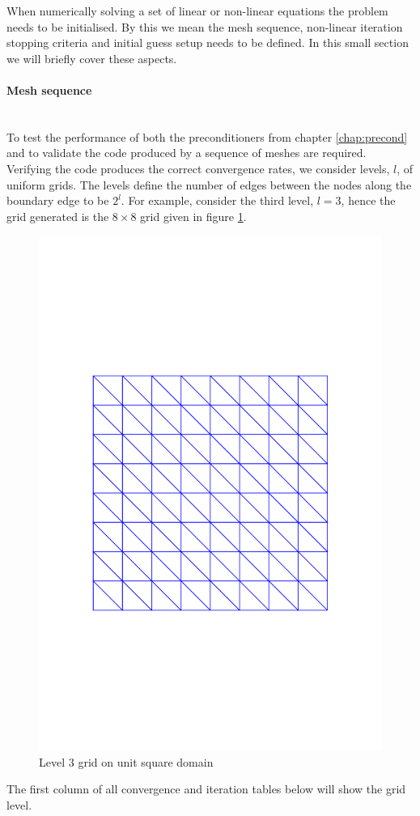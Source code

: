 When numerically solving a set of linear or non-linear equations the problem needs to be initialised. By this we mean the mesh sequence, non-linear iteration stopping criteria and initial guess setup needs to be defined. In this small section we will briefly cover these aspects.

\paragraph{Mesh sequence} ~\\

To test the performance of both the preconditioners from  chapter \ref{chap:precond} and to validate the code produced by \fenics a sequence of meshes are required. Verifying the code  produces the correct convergence rates, we consider levels, $l$, of uniform grids. The levels define the number of edges between the nodes along the boundary edge to be  $2^l$. For example, consider the third level, $l = 3$, hence the grid generated is the $8\times 8$ grid given in figure \ref{fig:2Dmesh}.
\begin{figure}[h!]
  \centering
    \includegraphics[scale=.5]{../Results/Figures/dolfin_plot_1}
    \caption{Level $3$ grid on unit square domain}
  \label{fig:2Dmesh}
\end{figure}
The first column of all convergence and iteration tables below will show the grid level.

